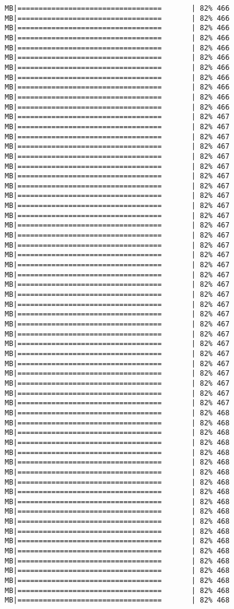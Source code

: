 \documentclass[
]{article}
\begin{document}
\begin{verbatim}
MB|==================================       | 82% 466 MB|==================================       | 82% 466 MB|==================================       | 82% 466 MB|==================================       | 82% 466 MB|==================================       | 82% 466 MB|==================================       | 82% 466 MB|==================================       | 82% 466 MB|==================================       | 82% 466 MB|==================================       | 82% 466 MB|==================================       | 82% 466 MB|==================================       | 82% 466 MB|==================================       | 82% 467 MB|==================================       | 82% 467 MB|==================================       | 82% 467 MB|==================================       | 82% 467 MB|==================================       | 82% 467 MB|==================================       | 82% 467 MB|==================================       | 82% 467 MB|==================================       | 82% 467 MB|==================================       | 82% 467 MB|==================================       | 82% 467 MB|==================================       | 82% 467 MB|==================================       | 82% 467 MB|==================================       | 82% 467 MB|==================================       | 82% 467 MB|==================================       | 82% 467 MB|==================================       | 82% 467 MB|==================================       | 82% 467 MB|==================================       | 82% 467 MB|==================================       | 82% 467 MB|==================================       | 82% 467 MB|==================================       | 82% 467 MB|==================================       | 82% 467 MB|==================================       | 82% 467 MB|==================================       | 82% 467 MB|==================================       | 82% 467 MB|==================================       | 82% 467 MB|==================================       | 82% 467 MB|==================================       | 82% 467 MB|==================================       | 82% 467 MB|==================================       | 82% 467 MB|==================================       | 82% 468 MB|==================================       | 82% 468 MB|==================================       | 82% 468 MB|==================================       | 82% 468 MB|==================================       | 82% 468 MB|==================================       | 82% 468 MB|==================================       | 82% 468 MB|==================================       | 82% 468 MB|==================================       | 82% 468 MB|==================================       | 82% 468 MB|==================================       | 82% 468 MB|==================================       | 82% 468 MB|==================================       | 82% 468 MB|==================================       | 82% 468 MB|==================================       | 82% 468 MB|==================================       | 82% 468 MB|==================================       | 82% 468 MB|==================================       | 82% 468 MB|==================================       | 82% 468 MB|==================================       | 82% 468 
\end{verbatim}
\end{document}
